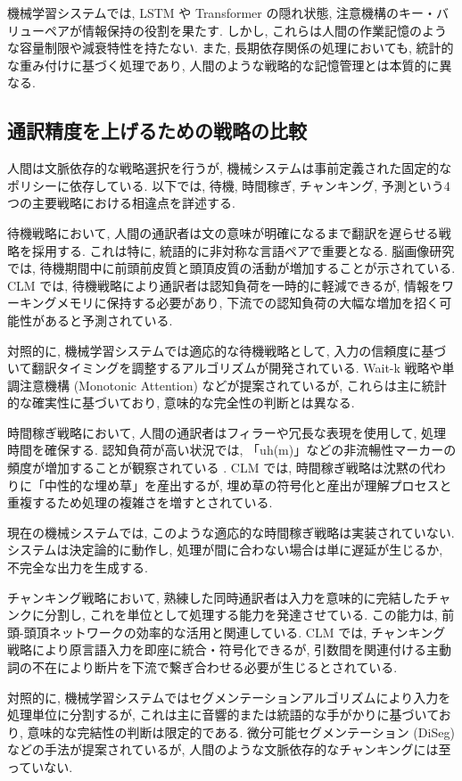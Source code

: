 機械学習システムでは, LSTM や Transformer の隠れ状態, 注意機構のキー・バリューペアが情報保持の役割を果たす.
しかし, これらは人間の作業記憶のような容量制限や減衰特性を持たない.
また, 長期依存関係の処理においても, 統計的な重み付けに基づく処理であり, 人間のような戦略的な記憶管理とは本質的に異なる.

\subsection{通訳精度を上げるための戦略の比較}

人間は文脈依存的な戦略選択を行うが, 機械システムは事前定義された固定的なポリシーに依存している.
以下では, 待機, 時間稼ぎ, チャンキング, 予測という4つの主要戦略における相違点を詳述する.

待機戦略において, 人間の通訳者は文の意味が明確になるまで翻訳を遅らせる戦略を採用する.
これは特に, 統語的に非対称な言語ペアで重要となる.
脳画像研究では, 待機期間中に前頭前皮質と頭頂皮質の活動が増加することが示されている.
CLM では, 待機戦略により通訳者は認知負荷を一時的に軽減できるが, 情報をワーキングメモリに保持する必要があり, 下流での認知負荷の大幅な増加を招く可能性があると予測されている.

対照的に, 機械学習システムでは適応的な待機戦略として, 入力の信頼度に基づいて翻訳タイミングを調整するアルゴリズムが開発されている.
Wait-k 戦略や単調注意機構 (Monotonic Attention) \cite{papi2023attention} などが提案されているが, これらは主に統計的な確実性に基づいており, 意味的な完全性の判断とは異なる.

時間稼ぎ戦略において, 人間の通訳者はフィラーや冗長な表現を使用して, 処理時間を確保する.
認知負荷が高い状況では, 「uh(m)」などの非流暢性マーカーの頻度が増加することが観察されている \cite{plevoets2018cognitive} .
CLM では, 時間稼ぎ戦略は沈黙の代わりに「中性的な埋め草」を産出するが, 埋め草の符号化と産出が理解プロセスと重複するため処理の複雑さを増すとされている.

現在の機械システムでは, このような適応的な時間稼ぎ戦略は実装されていない.
システムは決定論的に動作し, 処理が間に合わない場合は単に遅延が生じるか, 不完全な出力を生成する.

チャンキング戦略において, 熟練した同時通訳者は入力を意味的に完結したチャンクに分割し, これを単位として処理する能力を発達させている.
この能力は, 前頭-頭頂ネットワークの効率的な活用と関連している.
CLM では, チャンキング戦略により原言語入力を即座に統合・符号化できるが, 引数間を関連付ける主動詞の不在により断片を下流で繋ぎ合わせる必要が生じるとされている.

対照的に, 機械学習システムではセグメンテーションアルゴリズムにより入力を処理単位に分割するが, これは主に音響的または統語的な手がかりに基づいており, 意味的な完結性の判断は限定的である.
微分可能セグメンテーション (DiSeg) などの手法が提案されているが, 人間のような文脈依存的なチャンキングには至っていない.

